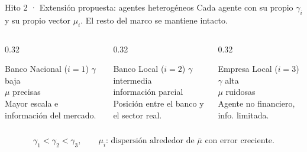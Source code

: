 \documentclass[xcolor=dvipsnames]{beamer}
\begin{document}
\begin{frame}{Hito 2 · Extensión propuesta: agentes heterogéneos}
Cada agente con su propio $\gamma_i$ y su propio vector $\mu_i$. El resto del marco se mantiene intacto.
\vfill
\begin{columns}[T]
  \begin{column}{0.32\textwidth}
    \begin{block}{Banco Nacional ($i=1$)}
      $\gamma$ baja\\ $\mu$ precisas\\[2pt]
      {\footnotesize Mayor escala e información del mercado.}
    \end{block}
  \end{column}
  \begin{column}{0.32\textwidth}
    \begin{block}{Banco Local ($i=2$)}
      $\gamma$ intermedia\\ información parcial\\[2pt]
      {\footnotesize Posición entre el banco y el sector real.}
    \end{block}
  \end{column}
  \begin{column}{0.32\textwidth}
    \begin{block}{Empresa Local ($i=3$)}
      $\gamma$ alta\\ $\mu$ ruidosas\\[2pt]
      {\footnotesize Agente no financiero, info. limitada.}
    \end{block}
  \end{column}
\end{columns}
\vfill
\begin{center}
  \[ \gamma_1 < \gamma_2 < \gamma_3, \qquad
     \mu_i \text{: dispersión alrededor de } \bar{\mu} \text{ con error creciente.} \]
\end{center}
\end{frame}
\end{document}
